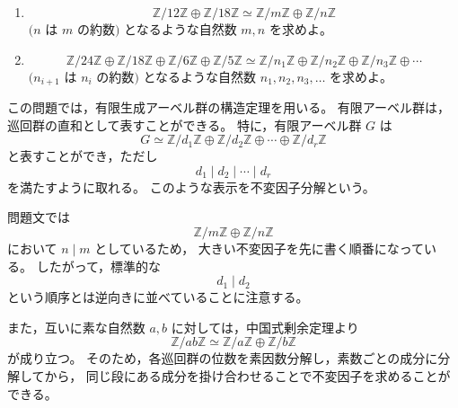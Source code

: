 

\begin{exercise}
	\begin{enumerate}
		\item
		\[
		\mathbb{Z}/12\mathbb{Z}
		\oplus
		\mathbb{Z}/18\mathbb{Z}
		\simeq
		\mathbb{Z}/m\mathbb{Z}
		\oplus
		\mathbb{Z}/n\mathbb{Z}
		\]
		\((n\) は \(m\) の約数\()\) となるような自然数 \(m,n\) を求めよ。
		
		\item
		\[
		\mathbb{Z}/24\mathbb{Z}
		\oplus
		\mathbb{Z}/18\mathbb{Z}
		\oplus
		\mathbb{Z}/6\mathbb{Z}
		\oplus
		\mathbb{Z}/5\mathbb{Z}
		\simeq
		\mathbb{Z}/n_1\mathbb{Z}
		\oplus
		\mathbb{Z}/n_2\mathbb{Z}
		\oplus
		\mathbb{Z}/n_3\mathbb{Z}
		\oplus
		\cdots
		\]
		\((n_{i+1}\) は \(n_i\) の約数\()\) となるような自然数
		\(n_1,n_2,n_3,\ldots\) を求めよ。
	\end{enumerate}
\end{exercise}

\begin{background}
	この問題では，有限生成アーベル群の構造定理を用いる。
	有限アーベル群は，巡回群の直和として表すことができる。
	特に，有限アーベル群 \(G\) は
	\[
	G
	\simeq
	\mathbb{Z}/d_1\mathbb{Z}
	\oplus
	\mathbb{Z}/d_2\mathbb{Z}
	\oplus
	\cdots
	\oplus
	\mathbb{Z}/d_r\mathbb{Z}
	\]
	と表すことができ，ただし
	\[
	d_1\mid d_2\mid \cdots \mid d_r
	\]
	を満たすように取れる。
	このような表示を不変因子分解という。
	
	問題文では
	\[
	\mathbb{Z}/m\mathbb{Z}
	\oplus
	\mathbb{Z}/n\mathbb{Z}
	\]
	において \(n\mid m\) としているため，
	大きい不変因子を先に書く順番になっている。
	したがって，標準的な
	\[
	d_1\mid d_2
	\]
	という順序とは逆向きに並べていることに注意する。
	
	また，互いに素な自然数 \(a,b\) に対しては，中国式剰余定理より
	\[
	\mathbb{Z}/ab\mathbb{Z}
	\simeq
	\mathbb{Z}/a\mathbb{Z}
	\oplus
	\mathbb{Z}/b\mathbb{Z}
	\]
	が成り立つ。
	そのため，各巡回群の位数を素因数分解し，素数ごとの成分に分解してから，
	同じ段にある成分を掛け合わせることで不変因子を求めることができる。
\end{background}

